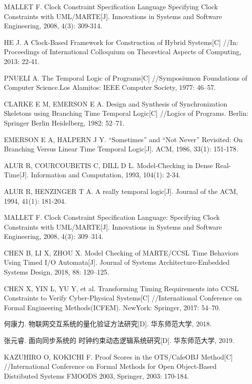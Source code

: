 \begin{thebibliography}{2}
MALLET F. Clock Constraint Specification Language Specifying Clock Constraints with UML/MARTE[J]. Innovations in Systems and Software Engineering, 2008, 4(3): 309-314.

HE J. A Clock-Based Framework for Construction of Hybrid Systems[C] //In: Proceedings of International Colloquium on Theoretical Aspects of Computing, 2013: 22-41.

PNUELI A. The Temporal Logic of Programs[C] //Symposiumon Foundations of Computer Science.Los Alamitos: IEEE Computer Society, 1977: 46–57.

CLARKE E M, EMERSON E A. Design and Synthesis of Synchronization Skeletons using Branching Time Temporal Logic[C] //Logics of Programs. Berlin: Springer Berlin Heidelberg, 1982: 52–71.

EMERSON E A, HALPERN J Y. “Sometimes” and “Not Never” Revisited: On Branching Versus Linear Time Temporal Logic[J]. ACM, 1986, 33(1): 151-178. 

ALUR R, COURCOUBETIS C, DILL D L. Model-Checking in Dense Real-Time[J]. Information and Computation, 1993, 104(1): 2-34.

	ALUR R, HENZINGER T A. A really temporal logic[J]. Journal of the ACM, 1994, 41(1): 181-204.

MALLET F. Clock Constraint Specification Language: Specifying Clock Constraints with UML/MARTE[J]. Innovations in Systems and Software Engineering, 2008, 4(3): 309–314.

CHEN B, LI X, ZHOU X. Model Checking of MARTE/CCSL Time Behaviors Using Timed I/O Automata[J]. Journal of Systems Architecture-Embedded Systems Design, 2018, 88: 120–125.

CHEN X, YIN L, YU Y, et al. Transforming Timing Requirements into CCSL Constraints to Verify Cyber-Physical Systems[C] //International Conference on Formal Engineering Methods(ICFEM). NewYork: Springer, 2017: 54–70.

何康力. 物联网交互系统的量化验证方法研究[D]. 华东师范大学, 2018.

张元睿. 面向同步系统的 时钟约束动态逻辑系统研究[D]. 华东师范大学, 2019.

KAZUHIRO O, KOKICHI F. Proof Scores in the OTS/CafeOBJ Method[C] //International Conference on Formal Methods for Open Object-Based Distributed Systems FMOODS 2003, Springer, 2003: 170-184.


\end{thebibliography}
